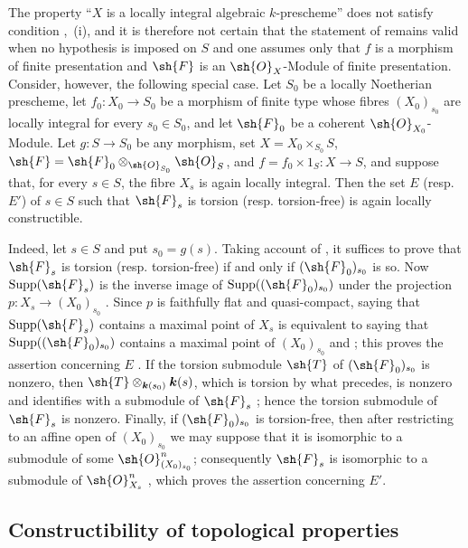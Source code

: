 \begin{remark}[9.4.9]
\label{IV.9.4.9}
The property ``$X$ is a locally integral algebraic $k$-prescheme'' does not satisfy condition ,~(i), and it is therefore not certain that the statement of  remains valid when no hypothesis is imposed on $S$ and one assumes only that $f$ is a morphism of finite presentation and $\sh{F}$ is an $\sh{O}_X$-Module of finite presentation. Consider, however, the following special case. Let $S_0$ be a locally Noetherian prescheme, let $f_0:X_0\to S_0$ be a morphism of finite type whose fibres $(X_0)_{s_0}$ are locally integral for every $s_0\in S_0$, and let $\sh{F}_0$ be a coherent $\sh{O}_{X_0}$-Module. Let $g:S\to S_0$ be any morphism, set
$X=X_0\times_{S_0}S$, $\sh{F}=\sh{F}_0\otimes_{\sh{O}_{S_0}}\sh{O}_S$, and $f=f_0\times 1_S:X\to S$, and suppose that, for every $s\in S$, the fibre $X_s$ is again locally integral. Then the set $E$ (resp. $E'$) of $s\in S$ such that $\sh{F}_s$ is torsion (resp. torsion-free) is again locally constructible.

Indeed, let $s\in S$ and put $s_0=g(s)$. Taking account of , it suffices to prove that $\sh{F}_s$ is torsion (resp. torsion-free) if and only if $(\sh{F}_0)_{s_0}$ is so. Now $\operatorname{Supp}(\sh{F}_s)$ is the inverse image of $\operatorname{Supp}((\sh{F}_0)_{s_0})$ under the projection $p:X_s\to(X_0)_{s_0}$ . Since $p$ is faithfully flat and quasi-compact, saying that $\operatorname{Supp}(\sh{F}_s)$ contains a maximal point of $X_s$ is equivalent to saying that $\operatorname{Supp}((\sh{F}_0)_{s_0})$ contains a maximal point of $(X_0)_{s_0}$  and ; this proves the assertion concerning $E$ . If the torsion submodule $\sh{T}$ of $(\sh{F}_0)_{s_0}$ is nonzero, then $\sh{T}\otimes_{\boldsymbol{k}(s_0)}\boldsymbol{k}(s)$, which is torsion by what precedes, is nonzero and identifies with a submodule of $\sh{F}_s$ ; hence the torsion submodule of $\sh{F}_s$ is nonzero. Finally, if $(\sh{F}_0)_{s_0}$ is torsion-free, then after restricting to an affine open of $(X_0)_{s_0}$ we may suppose that it is isomorphic to a submodule of some $\sh{O}_{(X_0)_{s_0}}^n$; consequently $\sh{F}_s$ is isomorphic to a submodule of $\sh{O}_{X_s}^n$ , which proves the assertion concerning $E'$.
\end{remark}

\subsection{Constructibility of topological properties}
\label{subsection:IV.9.5}

